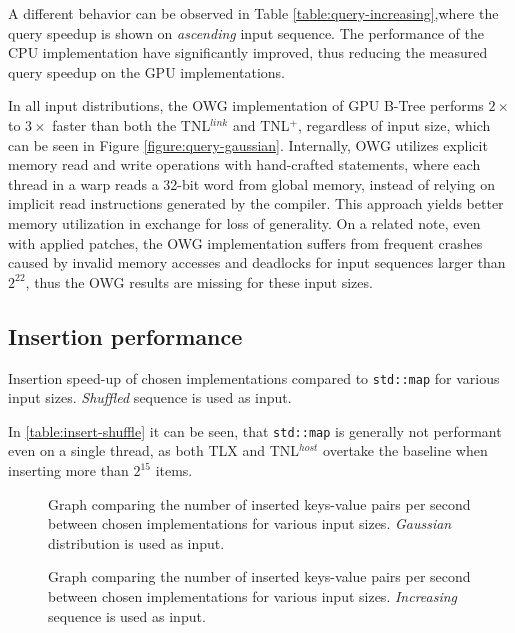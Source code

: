 A different behavior can be observed in Table \ref{table:query-increasing},where the query speedup is shown on \textit{ascending} input sequence. The performance of the CPU implementation have significantly improved, thus reducing the measured query speedup on the GPU implementations.

In all input distributions, the OWG implementation of GPU B-Tree performs $2\times$ to $3\times$ faster than both the TNL$^{link}$ and TNL$^+$, regardless of input size, which can be seen in Figure \ref{figure:query-gaussian}. Internally, OWG utilizes explicit memory read and write operations with hand-crafted  statements, where each thread in a warp reads a 32-bit word from global memory, instead of relying on implicit read instructions generated by the compiler. This approach yields better memory utilization in exchange for loss of generality. On a related note, even with applied patches, the OWG implementation suffers from frequent crashes caused by invalid memory accesses and deadlocks for input sequences larger than $2^{22}$, thus the OWG results are missing for these input sizes.

\subsection{Insertion performance}

\begin{table}[H]
  \centering
  
  \caption{Insertion speed-up of chosen implementations compared to \texttt{std::map} for various input sizes. \textit{Shuffled} sequence is used as input.}
  \label{table:insert-shuffle}
\end{table}

In \cref{table:insert-shuffle} it can be seen, that \texttt{std::map} is generally not performant even on a single thread, as both TLX and TNL$^{host}$ overtake the baseline when inserting more than $2^{15}$ items.


\begin{figure}
  
  \caption{Graph comparing the number of inserted keys-value pairs per second between chosen implementations for various input sizes. \textit{Gaussian} distribution is used as input.}
  \label{figure:insert-gaussian}
\end{figure}

\begin{figure}
  
  \caption{Graph comparing the number of inserted keys-value pairs per second between chosen implementations for various input sizes. \textit{Increasing} sequence is used as input.}
  \label{figure:insert-increasing}
\end{figure}

